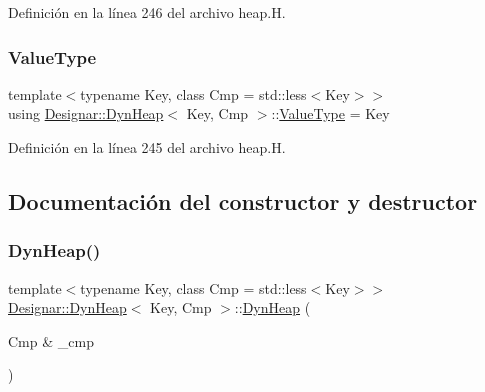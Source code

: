 Definición en la línea 246 del archivo heap.\+H.

\mbox{\label{class_designar_1_1_dyn_heap_a4c44d536a7ae76bbb7e667e1ea3b94ff}} 
\subsubsection{\texorpdfstring{Value\+Type}{ValueType}}
{\footnotesize\ttfamily template$<$typename Key, class Cmp = std\+::less$<$\+Key$>$$>$ \\
using \hyperlink{class_designar_1_1_dyn_heap}{Designar\+::\+Dyn\+Heap}$<$ Key, Cmp $>$\+::\hyperlink{class_designar_1_1_fixed_array_ac1cfeb4403a2dcbffd7ef494e5b873d0}{Value\+Type} =  Key}



Definición en la línea 245 del archivo heap.\+H.



\subsection{Documentación del constructor y destructor}
\mbox{\label{class_designar_1_1_dyn_heap_a156ccf78397ff8c10a3badf417043a28}} 
\subsubsection{\texorpdfstring{Dyn\+Heap()}{DynHeap()}\hspace{0.1cm}{\footnotesize\ttfamily [1/4]}}
{\footnotesize\ttfamily template$<$typename Key, class Cmp = std\+::less$<$\+Key$>$$>$ \\
\hyperlink{class_designar_1_1_dyn_heap}{Designar\+::\+Dyn\+Heap}$<$ Key, Cmp $>$\+::\hyperlink{class_designar_1_1_dyn_heap}{Dyn\+Heap} (\begin{DoxyParamCaption}\item[{Cmp \&}]{\+\_\+cmp }\end{DoxyParamCaption})\hspace{0.3cm}{\ttfamily [inline]}}




